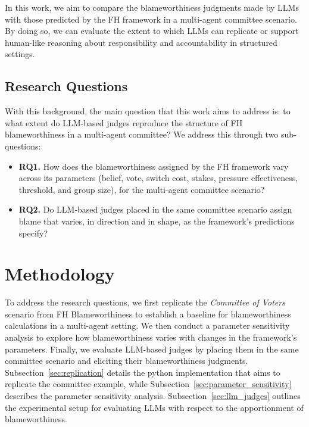 \documentclass{article}
\begin{document}
In this work, we aim to compare the blameworthiness judgments made by LLMs with those predicted by the FH framework in a multi-agent committee scenario. By doing so, we can evaluate the extent to which LLMs can replicate or support human-like reasoning about responsibility and accountability in structured settings.

\subsection{Research Questions}\label{sec:research_questions}

With this background, the main question that this work aims to address is: to what extent do LLM-based judges reproduce the structure of FH blameworthiness in a multi-agent committee? We address this through two sub-questions:

\begin{itemize}
  \item \textbf{RQ1.} How does the blameworthiness assigned by the FH framework vary across its parameters (belief, vote, switch cost, stakes, pressure effectiveness, threshold, and group size), for the multi-agent committee scenario?
  \item \textbf{RQ2.} Do LLM-based judges placed in the same committee scenario assign blame that varies, in direction and in shape, as the framework's predictions specify?
\end{itemize}


\section{Methodology}\label{sec:methodology}

To address the research questions, we first replicate the \textit{Committee of Voters} scenario from FH Blameworthiness \cite{friedenberg_blameworthiness_2019} to establish a baseline for blameworthiness calculations in a multi-agent setting. We then conduct a parameter sensitivity analysis to explore how blameworthiness varies with changes in the framework's parameters. Finally, we evaluate LLM-based judges by placing them in the same committee scenario and eliciting their blameworthiness judgments. Subsection~\ref{sec:replication} details the python implementation that aims to replicate the committee example, while Subsection~\ref{sec:parameter_sensitivity} describes the parameter sensitivity analysis. Subsection~\ref{sec:llm_judges} outlines the experimental setup for evaluating LLMs with respect to the apportionment of blameworthiness.
\end{document}
